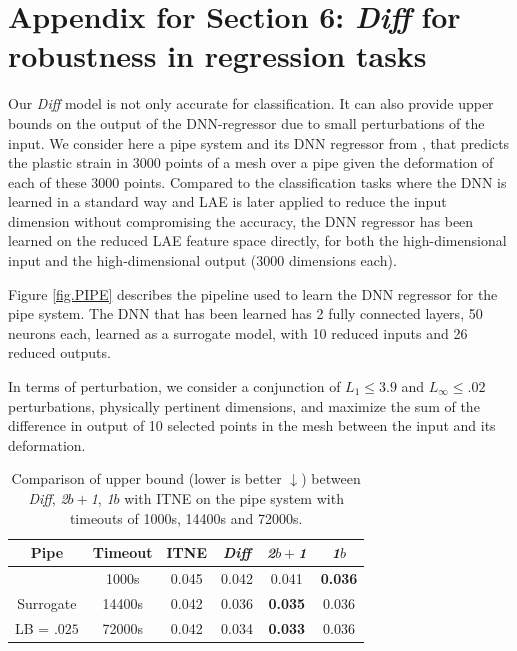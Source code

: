 \section{Appendix for Section 6: {\em Diff} for robustness in regression tasks}
\label{app:regr-task}


Our {\em Diff} model is not only accurate for classification. It can also provide upper bounds on the output of the DNN-regressor due to small perturbations of the input.
We consider here a pipe system and its DNN regressor from \cite{aiware},
that predicts the plastic strain in 3000 points of a mesh over a pipe given the deformation of each of these 3000 points.
Compared to the classification tasks where the DNN is learned in a standard way and LAE is later applied to reduce the input dimension without compromising the accuracy, the DNN regressor has been learned on the reduced LAE feature space directly, for both the high-dimensional input and the high-dimensional output (3000 dimensions each).







Figure \ref{fig.PIPE} describes the pipeline used to learn the DNN regressor for the pipe system. The DNN that has been learned has 2 fully connected layers, 50 neurons each, learned as a surrogate model, with 10 reduced inputs and 26 reduced outputs.

In terms of perturbation, we consider a conjunction of $L_1 \leq 3.9$ and $L_\infty \leq .02$ perturbations, physically pertinent dimensions, and maximize the sum of the difference in output of 10 selected points in the mesh between the input and its deformation.





\begin{table}[h!]
	\centering
	\begin{tabular}{|c | c c c c c|} 
		\hline
		Pipe & Timeout & ITNE & {\em Diff} & {\em 2$b+$1} & {\em 1$b$}
		\\\hline 
		& 1000s & 0.045 & 0.042 & 0.041 & {\bf 0.036}
		\\
		Surrogate  & 14400s & 0.042 & 0.036 & {\bf 0.035} & 0.036
		\\
		LB = $.025$  & 72000s & 0.042 & 0.034 & {\bf 0.033} & 0.036
		\\\hline
	\end{tabular}
	\caption{Comparison of upper bound (lower is better $\downarrow$) between {\em Diff}, {\em 2$b+$1}, {\em 1$b$} with ITNE on the pipe system with timeouts of 1000s, 14400s and 72000s.}
\label{table.pipe}
\end{table}





